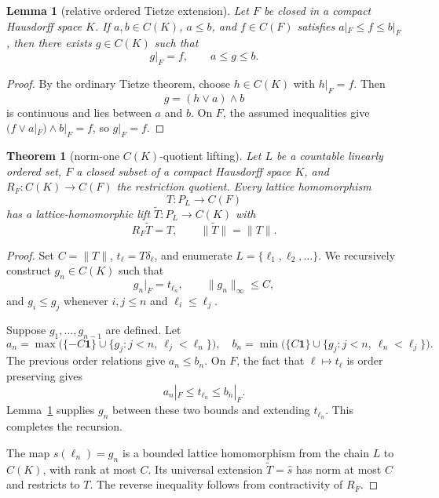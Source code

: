 \documentclass[11pt]{article}
\newtheorem{theorem}{Theorem}
\newtheorem{lemma}{Lemma}
\begin{document}
\begin{lemma}[relative ordered Tietze extension]\label{lem:tietze}
Let \(F\) be closed in a compact Hausdorff space \(K\).  If
\(a,b\in C(K)\), \(a\le b\), and \(f\in C(F)\) satisfies
\(a|_F\le f\le b|_F\), then there exists \(g\in C(K)\) such that
\[
 g|_F=f,\qquad a\le g\le b.
\]
\end{lemma}

\begin{proof}
By the ordinary Tietze theorem, choose \(h\in C(K)\) with \(h|_F=f\).
Then
\[
 g=(h\vee a)\wedge b
\]
is continuous and lies between \(a\) and \(b\).  On \(F\), the assumed
inequalities give \((f\vee a|_F)\wedge b|_F=f\), so \(g|_F=f\).
\end{proof}

\begin{theorem}[norm-one \(C(K)\)-quotient lifting]\label{thm:ck}
Let \(L\) be a countable linearly ordered set, \(F\) a closed subset of a
compact Hausdorff space \(K\), and \(R_F:C(K)\to C(F)\) the restriction
quotient.  Every lattice homomorphism
\[
 T:P_L\longrightarrow C(F)
\]
has a lattice-homomorphic lift \(\widetilde T:P_L\to C(K)\) with
\[
 R_F\widetilde T=T,\qquad \|\widetilde T\|=\|T\|.
\]
\end{theorem}

\begin{proof}
Set \(C=\|T\|\), \(t_\ell=T\delta_\ell\), and enumerate
\(L=\{\ell_1,\ell_2,\ldots\}\).  We recursively construct
\(g_n\in C(K)\) such that
\[
 g_n|_F=t_{\ell_n},\qquad \|g_n\|_\infty\le C,
\]
and \(g_i\le g_j\) whenever \(i,j\le n\) and
\(\ell_i\le\ell_j\).

Suppose \(g_1,\ldots,g_{n-1}\) are defined.  Let
\[
 a_n=\max\bigl(\{-C\mathbf1\}\cup
   \{g_j:j<n,\ \ell_j<\ell_n\}\bigr),
\quad
 b_n=\min\bigl(\{C\mathbf1\}\cup
   \{g_j:j<n,\ \ell_n<\ell_j\}\bigr).
\]
The previous order relations give \(a_n\le b_n\).  On \(F\), the fact
that \(\ell\mapsto t_\ell\) is order preserving gives
\[
 a_n|_F\le t_{\ell_n}\le b_n|_F.
\]
Lemma~\ref{lem:tietze} supplies \(g_n\) between these two bounds and
extending \(t_{\ell_n}\).  This completes the recursion.

The map \(s(\ell_n)=g_n\) is a bounded lattice homomorphism from the
chain \(L\) to \(C(K)\), with rank at most \(C\).  Its universal extension
\(\widetilde T=\widehat s\) has norm at most \(C\) and restricts to \(T\).
The reverse inequality follows from contractivity of \(R_F\).
\end{proof}
\end{document}

